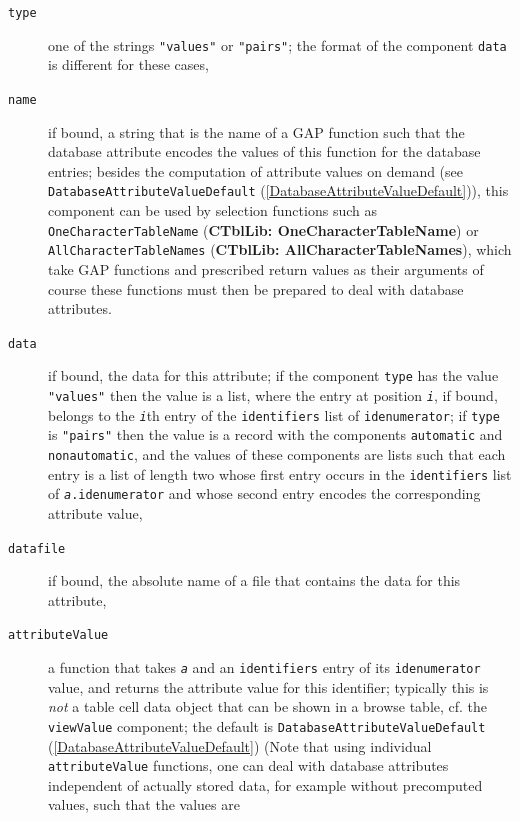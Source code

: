 \documentclass[a4paper,11pt]{report}
\begin{document}
{{{ 
\begin{description}
\item[{\texttt{type}}]  one of the strings \texttt{"values"} or \texttt{"pairs"}; the format of the component \texttt{data} is different for these cases, 
\item[{\texttt{name}}]  if bound, a string that is the name of a \textsf{GAP} function such that the database attribute encodes the values of this function
for the database entries; besides the computation of attribute values on
demand (see \texttt{DatabaseAttributeValueDefault} (\ref{DatabaseAttributeValueDefault})), this component can be used by selection functions such as \texttt{OneCharacterTableName} (\textbf{CTblLib: OneCharacterTableName}) or \texttt{AllCharacterTableNames} (\textbf{CTblLib: AllCharacterTableNames}), which take \textsf{GAP} functions and prescribed return values as their arguments {\textendash}of
course these functions must then be prepared to deal with database attributes. 
\item[{\texttt{data}}]  if bound, the data for this attribute; if the component \texttt{type} has the value \texttt{"values"} then the value is a list, where the entry at position \mbox{\texttt{\mdseries\slshape i}}, if bound, belongs to the \mbox{\texttt{\mdseries\slshape i}}\texttt{}th entry of the \texttt{identifiers} list of \texttt{idenumerator}; if \texttt{type} is \texttt{"pairs"} then the value is a record with the components \texttt{automatic} and \texttt{nonautomatic}, and the values of these components are lists such that each entry is a list
of length two whose first entry occurs in the \texttt{identifiers} list of \mbox{\texttt{\mdseries\slshape a}}\texttt{.idenumerator} and whose second entry encodes the corresponding attribute value, 
\item[{\texttt{datafile}}]  if bound, the absolute name of a file that contains the data for this
attribute, 
\item[{\texttt{attributeValue}}]  a function that takes \mbox{\texttt{\mdseries\slshape a}} and an \texttt{identifiers} entry of its \texttt{idenumerator} value, and returns the attribute value for this identifier; typically this is \emph{not} a table cell data object that can be shown in a browse table, cf. the \texttt{viewValue} component; the default is \texttt{DatabaseAttributeValueDefault} (\ref{DatabaseAttributeValueDefault}) (Note that using individual \texttt{attributeValue} functions, one can deal with database attributes independent of actually
stored data, for example without precomputed values, such that the values are

\end{description}}}}
\end{document}

